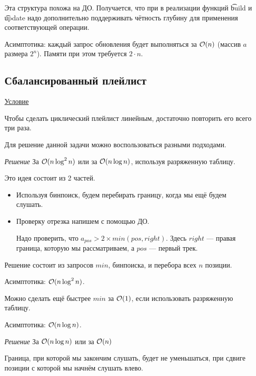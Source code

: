 Эта структура похожа на ДО. Получается, что при в реализации функций \t{build} и \t{update} надо дополнительно поддерживать чётность глубину для применения соответствующей операции.

Асимптотика: каждый запрос обновления будет выполняться за $\mathcal{O}(n)$ (массив $a$ размера $2^n$). Памяти при этом требуется $2 \cdot n$.

\subsection{Сбалансированный плейлист}

\href{https://codeforces.com/problemset/problem/1237/D}{Условие}

Чтобы сделать циклический плейлист линейным, достаточно повторить его всего три раза.

Для решение данной задачи можно воспользоваться разными подходами. 

{\it Решение } За $ \mathcal{O}(n \log^2 n)$ или за $\mathcal{O}(n \log n)$, используя разряженную таблицу.

Это идея состоит из 2 частей.
\up \up
\begin{itemize}
	\item Используя бинпоиск, будем перебирать границу, когда мы ещё будем слушать.
	\item Проверку отрезка напишем с помощью ДО.
	
	Надо проверить, что $a_{pos} > 2 \times min(pos, right)$. Здесь $right$ --- правая граница, которую мы рассматриваем, а $pos$ --- первый трек.
\end{itemize}
\up \up
Решение состоит из запросов $min$, бинпоиска, и перебора всех $n$ позиции.

Асимптотика: $ \mathcal{O}(n \log^2 n)$.
\down

Можно сделать ещё быстрее $min$ за $\mathcal{O}(1)$, если использовать разряженную таблицу.

Асимптотика: $\mathcal{O}(n \log n)$. \href{https://codeforces.com/contest/1237/submission/62698504}{} \href{https://codeforces.com/contest/1237/submission/63401681}{}

\down

{\it Решение } За $ \mathcal{O}(n \log n)$ или за $\mathcal{O}(n)$ \href{https://codeforces.com/contest/1237/submission/62704110}{}

\begin{Prop}Граница, при которой мы закончим слушать, будет не уменьшаться, при сдвиге позиции с которой мы начнём слушать влево.\end{Prop}

